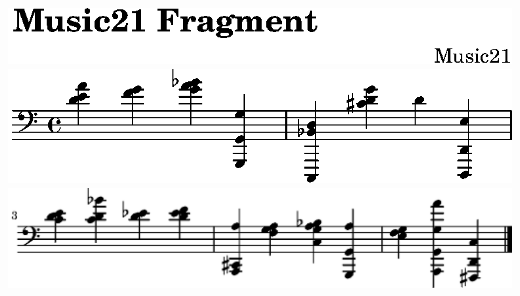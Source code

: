 \includegraphics{../examples/bwv2/bd/lily-90c88b91-1}%
\ifx\betweenLilyPondSystem \undefined
  \linebreak
\else
  \expandafter{}%
\fi
\includegraphics{../examples/bwv2/bd/lily-90c88b91-2}%
\ifx\betweenLilyPondSystem \undefined
  \linebreak
\else
  \expandafter{}%
\fi
\includegraphics{../examples/bwv2/bd/lily-90c88b91-3}%
